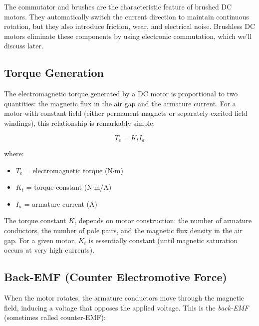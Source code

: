 The commutator and brushes are the characteristic feature of brushed DC motors. They automatically switch the current direction to maintain continuous rotation, but they also introduce friction, wear, and electrical noise. Brushless DC motors eliminate these components by using electronic commutation, which we'll discuss later.

\subsection{Torque Generation}

The electromagnetic torque generated by a DC motor is proportional to two quantities: the magnetic flux in the air gap and the armature current. For a motor with constant field (either permanent magnets or separately excited field windings), this relationship is remarkably simple:

\begin{equation}
    \boxed{T_e = K_t I_a}
    \label{eq:torque_constant}
\end{equation}

where:
\begin{itemize}
    \item $T_e$ = electromagnetic torque (N$\cdot$m)
    \item $K_t$ = torque constant (N$\cdot$m/A)
    \item $I_a$ = armature current (A)
\end{itemize}

The torque constant $K_t$ depends on motor construction: the number of armature conductors, the number of pole pairs, and the magnetic flux density in the air gap. For a given motor, $K_t$ is essentially constant (until magnetic saturation occurs at very high currents).


\subsection{Back-EMF (Counter Electromotive Force)}

When the motor rotates, the armature conductors move through the magnetic field, inducing a voltage that opposes the applied voltage. This is the \textit{back-EMF} (sometimes called counter-EMF):

